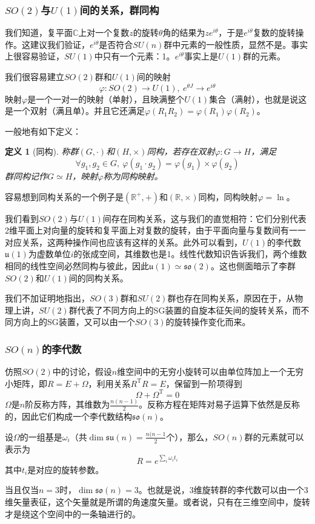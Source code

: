 \documentclass[a4paper,11pt]{ctexart}
\newcommand{\beq}{\begin{equation}}
\newcommand{\eeq}{\end{equation}}
\newcommand{\reals}{\mathbb{R}}
\newcommand{\complexs}{\mathbb{C}}
\newcommand{\su}{\mathfrak{su}}
\newcommand{\so}{\mathfrak{so}}
\newtheorem{dfn}{定义}[section]
\begin{document}
\subsubsection{$SO(2)$与$U(1)$间的关系，群同构}
我们知道，复平面$\complexs$上对一个复数$z$的旋转$\theta$角的结果为$ze^{i\theta}$，于是$e^{i\theta}$复数的旋转操作。这建议我们验证，$e^{i\theta}$是否符合$SU(n)$群中元素的一般性质，显然不是。事实上很容易验证，$SU(1)$中只有一个元素：1。$e^{i\theta}$事实上是$U(1)$群的元素。\par
我们很容易建立$SO(2)$群和$U(1)$间的映射
\beq
\varphi : SO(2) \to U(1),\ e^{\theta J} \to e^{i\theta}
\eeq
映射$\varphi$是一个一对一的映射（单射），且映满整个$U(1)$集合（满射），也就是说这是一个双射（满且单）。并且它还满足$\varphi(R_1 R_2) = \varphi(R_1) \varphi(R_2)$。
\par
一般地有如下定义：
\begin{dfn}[同构]
称群$(G,\cdot)$和$(H,\times)$同构，若存在双射$\varphi: G\to H$，满足
\beq
\forall g_1,g_2 \in G,\ \varphi(g_1 \cdot g_2) = \varphi(g_1) \times \varphi(g_2)
\eeq
群同构记作$G \simeq H$，映射$\varphi$称为同构映射。
\end{dfn}
容易想到同构关系的一个例子是$(\reals^+,+)$和$(\reals,\times)$同构，同构映射$\varphi = \ln$。
\par
我们看到$SO(2)$与$U(1)$间存在同构关系，这与我们的直觉相符：它们分别代表2维平面上对向量的旋转和复平面上对复数的旋转，由于平面向量与复数间有一一对应关系，这两种操作间也应该有这样的关系。此外可以看到，$U(1)$的李代数$\mathfrak{u}(1)$为虚数单位$i$的张成空间，其维数也是1。线性代数知识告诉我们，两个维数相同的线性空间必然同构与彼此，因此$\mathfrak{u}(1) \simeq \so(2)$。这也侧面暗示了李群$SO(2)$和$U(1)$间的同构关系。
\par
我们不加证明地指出，$SO(3)$群和$SU(2)$群也存在同构关系，原因在于，从物理上讲，$SU(2)$群代表了不同方向上的SG装置的自旋本征矢间的旋转关系，而不同方向上的SG装置，又可以由一个$SO(3)$的旋转操作变化而来。
\subsubsection{$SO(n)$的李代数}
仿照$SO(2)$中的讨论，假设$n$维空间中的无穷小旋转可以由单位阵加上一个无穷小矩阵，即$R= E + \varOmega$，利用关系$R^\mathrm{T} R= E$，保留到一阶项得到
\beq
\varOmega + \varOmega^\mathrm{T} = 0
\eeq
$\varOmega$是$n$阶反称方阵，其维数为$\frac{n(n-1)}{2}$。反称方程在矩阵对易子运算下依然是反称的，因此它们构成一个李代数结构$\so (n)$。
\par
设$\varOmega$的一组基是$\omega_i$（共$\dim \su(n) = \frac{n(n-1}{2}$个），那么，$SO(n)$群的元素就可以表示为
\beq
R = e^{\sum_i \omega_i t_i}
\eeq
其中$t_i$是对应的旋转参数。
\par
当且仅当$n = 3$时，$\dim \so(n) = 3$。也就是说，3维旋转群的李代数可以由一个3维矢量表征，这个矢量就是所谓的角速度矢量。或者说，只有在三维空间中，旋转才是绕这个空间中的一条轴进行的。
\end{document}
